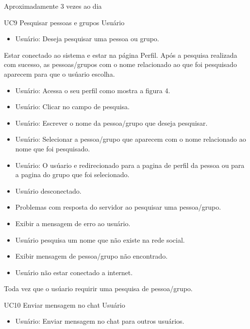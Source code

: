 {Aproximadamente 3 vezes ao dia}
{

}
\casoDeUso
{UC9}
{Pesquisar pessoas e grupos}
{Usuário}
{
\begin{itemize}
	\item Usuário: Deseja pesquisar uma pessoa ou grupo.	
\end{itemize}
}
{Estar conectado ao sistema e estar na página Perfil.}
{Após a pesquisa realizada com sucesso, as pessoas/grupos com o nome relacionado ao que foi pesquisado aparecem para que o usúario escolha.}
{
\begin{itemize}
	\item Usuário: Acessa o seu perfil como mostra a figura 4.
	\item Usuário: Clicar no campo de pesquisa.
	\item Usuário: Escrever o nome da pessoa/grupo que deseja pesquisar.
	\item Usuário: Selecionar a pessoa/grupo que aparecem com o nome relacionado ao nome que foi pesquisado.
	\item Usuário: O usúario e redirecionado para a pagina de perfil da pessoa ou para a pagina do grupo que foi selecionado.
\end{itemize}
}
{
\begin{itemize}
	\item Usuário desconectado.
	\item Problemas com resposta do servidor ao pesquisar uma pessoa/grupo.
	\item Exibir a mensagem de erro ao usuário.
	\item Usuário pesquisa um nome que não existe na rede social.
	\item Exibir mensagem de pessoa/grupo não encontrado.
	\item Usuário não estar conectado a internet.
\end{itemize}
}
{Toda vez que o usúario requirir uma pesquisa de pessoa/grupo.}
{

}
\casoDeUso
{UC10}
{Enviar mensagem no chat}
{Usuário}
{
\begin{itemize}
	\item Usuário: Enviar mensagem no chat para outros usuários.
	
\end{itemize}

}
